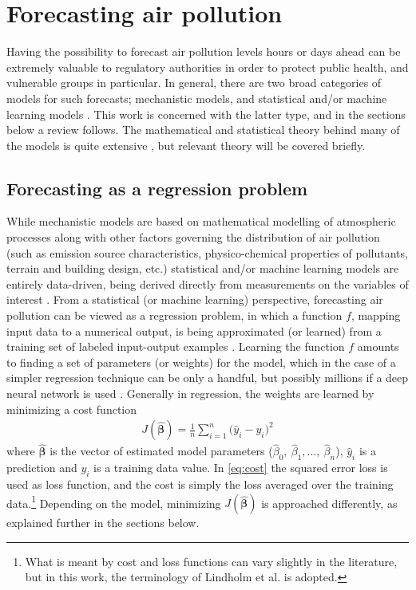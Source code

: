 \section{Forecasting air pollution}

Having the possibility to forecast air pollution levels hours or days ahead can be extremely valuable to regulatory authorities in order to protect public health, and vulnerable groups in particular. In general, there are two broad categories of models for such forecasts; mechanistic models, and statistical and/or machine learning models \cite{ElHarbawi2013}. This work is concerned with the latter type, and in the sections below a review follows. The mathematical and statistical theory behind many of the models is quite extensive \cite{Hastie2009, Montgomery2015, smlbook, LeCun2015}, but relevant theory will be covered briefly.

\subsection{Forecasting as a regression problem}
\label{sec:forecasting}
While mechanistic models are based on mathematical modelling of atmospheric processes along with other factors governing the distribution of air pollution (such as emission source characteristics, physico-chemical properties of pollutants, terrain and building design, etc.) statistical and/or machine learning models are entirely data-driven, being derived directly from measurements on the variables of interest \cite{ElHarbawi2013}. From a statistical (or machine learning) perspective, forecasting air pollution can be viewed as a regression problem, in which a function $f$, mapping input data to a numerical output, is being approximated (or learned) from a training set of labeled input-output examples \cite{smlbook}. Learning the function $f$ amounts to finding a set of parameters (or weights) for the model, which in the case of a simpler regression technique can be only a handful, but possibly millions if a deep neural network is used \cite{smlbook}. Generally in regression, the weights are learned by minimizing a cost function
\begin{align}
J(\bm{\hat{\beta}}) = \frac{1}{n} \sum_{i=1}^{n} \big(\hat{y}_i - y_i \big)^2
\label{eq:cost}
\end{align}
where $\bm{\hat{\beta}}$ is the vector of estimated model parameters ($\hat{\beta}_0, \: \hat{\beta}_1, ..., \: \hat{\beta}_n$), $\hat{y}_i$ is a prediction and $y_i$ is a training data value\cite{smlbook}. In \cref{eq:cost} the squared error loss is used as loss function, and the cost is simply the loss averaged over the training data.\footnote{What is meant by cost and loss functions can vary slightly in the literature, but in this work, the terminology of Lindholm et al. \cite{smlbook} is adopted.} Depending on the model, minimizing $J(\bm{\hat{\beta}})$ is approached differently, as explained further in the sections below. 

